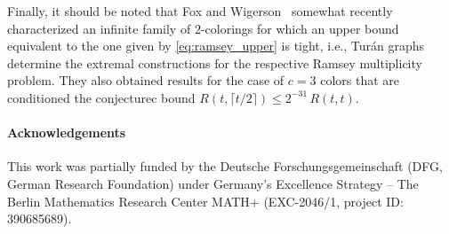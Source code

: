 \documentclass[a4paper,11pt]{article}
\numberwithin{equation}{section}
\begin{document}
Finally, it should be noted that Fox and Wigerson~\cite{fox2023ramsey} somewhat recently characterized an infinite family of $2$-colorings for which an upper bound equivalent to the one given by \cref{eq:ramsey_upper} is tight, i.e., Tur{\'a}n graphs determine the extremal constructions for the respective Ramsey multiplicity problem. They also obtained results for the case of $c=3$ colors that are conditioned the conjecturec bound $R(t, \lceil t/2 \rceil) \leq 2^{-31} \, R(t,t)$.



\paragraph{Acknowledgements} This work was partially funded by the Deutsche Forschungsgemeinschaft (DFG, German Research Foundation) under Germany’s Excellence Strategy – The Berlin Mathematics Research Center MATH+ (EXC-2046/1, project ID: 390685689).


%
%
%
% 
% 
%
\end{document}
